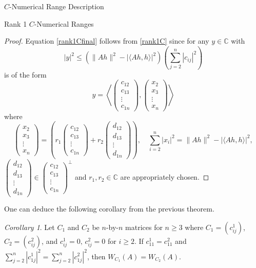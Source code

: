 \documentclass[12pt]{article}
\theoremstyle{plain}
\theoremstyle{definition}
\theoremstyle{remark}
\newtheorem{Corollary}[Theorem]{Corollary}
\numberwithin{equation}{section}
\begin{document}
\begin{section}{$C$-Numerical Range Description}
\begin{subsection}{Rank 1 $C$-Numerical Ranges}
\begin{proof}
Equation \eqref{rank1Cfinal} follows from \eqref{rank1C} since for any $ y \in \mathbb{C}$ with $$|y|^2 \leq (\|Ah\|^2- |\langle Ah,h\rangle|^2) \left( \sum_{j=2}^n|c_{ij}|^2 \right)$$ is of the form 
$$
y = \left\langle \begin{pmatrix}
            c_{12} \\
            c_{13} \\
            \vdots \\
            c_{1n}
        \end{pmatrix}, \begin{pmatrix}
            x_{2} \\
            x_{3} \\
            \vdots \\
            x_{n}
        \end{pmatrix} \right\rangle  
$$where $$
\begin{pmatrix}
    x_2 \\
    x_3 \\
    \vdots \\
    x_n
\end{pmatrix} =  \left( r_1 \begin{pmatrix}
            c_{12} \\
            c_{13} \\
            \vdots \\
            c_{1n}
        \end{pmatrix}+ r_2 \begin{pmatrix}
            d_{12} \\
            d_{13} \\
            \vdots \\
            d_{1n}
        \end{pmatrix} \right), \quad \sum_{i=2}^n|x_i|^2 = \|Ah\|^2- |\langle Ah,h\rangle|^2,
$$
$\begin{pmatrix}
            d_{12} \\
            d_{13} \\
            \vdots \\
            d_{1n}
        \end{pmatrix} \in \begin{pmatrix}
            c_{12} \\
            c_{13} \\
            \vdots \\
            c_{1n}
        \end{pmatrix}^{\perp}$ and $ r_1, r_2 \in \mathbb{C}$ are appropriately chosen.
\end{proof}
One can deduce the following corollary from the previous theorem.
\begin{Corollary}
    Let $C_1$ and $C_2$ be $n$-by-$n$ matrices for $n\geq 3$ where $C_1 = (c_{ij}^1)$,  $C_2 = (c_{ij}^2)$, and $c_{ij}^1 = 0, \, c_{ij}^2 = 0 $ for $i \geq 2$. If $c_{11}^1 = c_{11}^2$ and $\sum_{j=2}^n|c_{1j}^1|^2  = \sum_{j=2}^n|c_{1j}^2|^2 $, then $W_{C_1}(A) = W_{C_2}(A)$. 
\end{Corollary}



\end{subsection}
\end{section}
\end{document}
